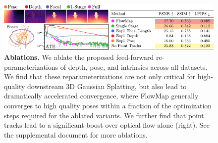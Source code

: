 \begin{figure}[t]
\includegraphics{figures/ablations/fig_ablations_pdf.pdf}



\caption{
\textbf{Ablations.}
We ablate the proposed feed-forward re-parameterizations of depth, pose, and intrinsics across all datasets.
We find that these reparameterizations are not only critical for high-quality downstream 3D Gaussian Splatting, but also lead to dramatically accelerated convergence, where FlowMap generally converges to high quality poses within a fraction of the optimization steps required for the ablated variants.
We further find that point tracks lead to a significant boost over optical flow alone (right).
See the supplemental document for more ablations.
\vspace{-10pt}
}
\label{fig:ablations}
\end{figure}
